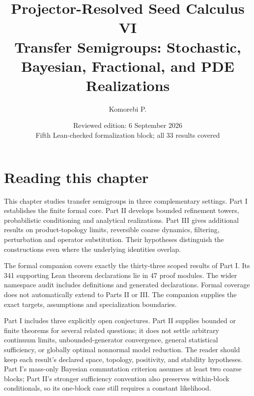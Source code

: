 \documentclass[11pt,letterpaper]{article}
\title{\textbf{Projector-Resolved Seed Calculus VI}\\[0.45em]
\large Transfer Semigroups: Stochastic, Bayesian, Fractional, and PDE Realizations}
\author{Komorebi P.}
\date{Reviewed edition: 6 September 2026\\\small Fifth Lean-checked formalization block; all 33 results covered}
\theoremstyle{plain}
\theoremstyle{plain}
\theoremstyle{plain}
\theoremstyle{definition}
\theoremstyle{definition}
\theoremstyle{definition}
\theoremstyle{definition}
\theoremstyle{definition}
\theoremstyle{remark}
\theoremstyle{remark}
\theoremstyle{remark}
\theoremstyle{remark}
\theoremstyle{remark}
\theoremstyle{remark}
\begin{document}
\KomorebiCover
{}

\section*{Reading this chapter}
This chapter studies transfer semigroups in three complementary settings. Part I establishes the finite formal core. Part II develops bounded refinement towers, probabilistic conditioning and analytical realizations. Part III gives additional results on product-topology limits, reversible coarse dynamics, filtering, perturbation and operator substitution. Their hypotheses distinguish the constructions even where the underlying identities overlap.

The formal companion covers exactly the thirty-three scoped results of Part I. Its 341 supporting Lean theorem declarations lie in 47 proof modules. The wider namespace audit includes definitions and generated declarations. Formal coverage does not automatically extend to Parts II or III. The companion supplies the exact targets, assumptions and specialization boundaries.

Part I includes three explicitly open conjectures. Part II supplies bounded or finite theorems for several related questions; it does not settle arbitrary continuum limits, unbounded-generator convergence, general statistical sufficiency, or globally optimal nonnormal model reduction. The reader should keep each result's declared space, topology, positivity, and stability hypotheses. Part I's mass-only Bayesian commutation criterion assumes at least two coarse blocks; Part II's stronger sufficiency convention also preserves within-block conditionals, so its one-block case still requires a constant likelihood.
\end{document}
